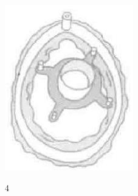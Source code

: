 \documentclass[10pt]{article}
\begin{document}
\begin{center}
\includegraphics[max width=\textwidth]{2024_07_05_645bb794a4d4f32ee0c8g-283(3)}
\end{center}

4
\end{document}
